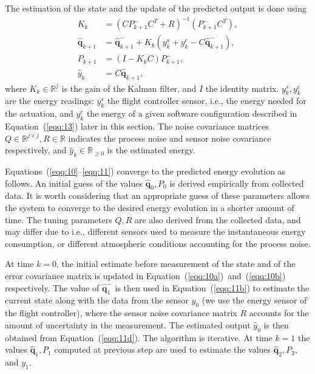 \documentclass[letterpaper,10pt,conference]{ieeeconf}
\begin{document}
The estimation of the state and the update of the predicted output is done using
\begin{subequations}\label{eqq:11}\begin{align}
  K_k&=(CP_{k+1}^-C^T+R)^{-1}(P_{k+1}^-C^T),\\
  \hat{\mathbf{q}}_{k+1}&=\hat{\mathbf{q}}_{k+1}^-+K_k(y_k^s+y_k^c-C\hat{\mathbf{q}}_{k+1}^-),\label{eqq:11b}\\
  P_{k+1}&=(I-K_kC)P_{k+1}^-,\\
  \hat{y}_k&=C\hat{\mathbf{q}}_{k+1},\label{eqq:11d}
\end{align}
\end{subequations}
where $K_k\in\mathbb{R}^j$ is the gain of the Kalman filter, and $I$ the identity matrix. $y_k^s,y_k^c$ are the energy readings: $y_k^s$ the flight controller sensor, i.e., the energy needed for the actuation, and $y_k^c$ the energy of a given software configuration described in Equation~(\ref{eqq:13}) later in this section. The noise covariance matrices $Q\in\mathbb{R}^{j\times j},R\in\mathbb{R}$ indicates the process noise and sensor noise covariance respectively, and $\hat{y}_k\in\mathbb{R}_{\geq 0}$ is the estimated energy.

Equations~(\ref{eqq:10}--\ref{eqq:11}) converge to the predicted energy evolution as follows. An initial guess of the values $\hat{\mathbf{q}}_0,P_0$ is derived empirically from collected data. It is worth considering that an appropriate guess of these parameters allows the system to converge to the desired energy evolution in a shorter amount of time. The tuning parameters $Q,R$ are also derived from the collected data, and may differ due to i.e., different sensors used to measure the instantaneous energy consumption, or different atmospheric conditions accounting for the process noise.

At time $k=0$, the initial estimate before measurement of the state and of the error covariance matrix is updated in Equation~(\ref{eqq:10a})~and~(\ref{eqq:10b}) respectively. The value of $\hat{\mathbf{q}}_1^-$ is then used in Equation~(\ref{eqq:11b}) to estimate the current state along with the data from the sensor $y_0$ (we use the energy sensor of the flight controller), where the sensor noise covariance matrix $R$ accounts for the amount of uncertainty in the measurement. The estimated output $\hat{y}_0$ is then obtained from Equation~(\ref{eqq:11d}). The algorithm is iterative. At time $k=1$ the values $\hat{\mathbf{q}}_1,P_1$ computed at previous step are used to estimate the values $\hat{\mathbf{q}}_2,P_2,$ and $y_1$.
\end{document}
